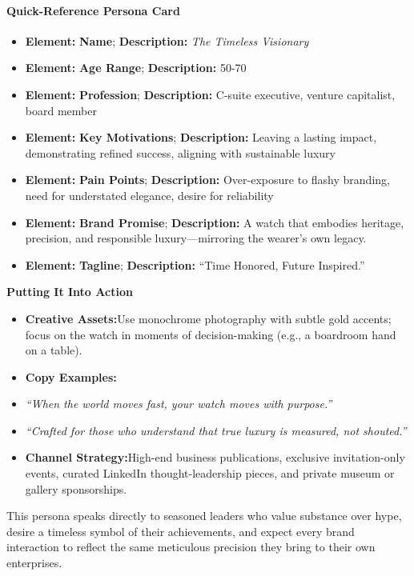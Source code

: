 \begin{persistbenchsample}[title={GPT-OSS-120B -- Sample 2 (+4 Improvement)}]
\paragraph{Quick-Reference Persona Card}
\begin{itemize}
  \item \textbf{Element:} \textbf{Name}; \textbf{Description:} \emph{The Timeless Visionary}
  \item \textbf{Element:} \textbf{Age Range}; \textbf{Description:} 50-70
  \item \textbf{Element:} \textbf{Profession}; \textbf{Description:} C-suite executive, venture capitalist, board member
  \item \textbf{Element:} \textbf{Key Motivations}; \textbf{Description:} Leaving a lasting impact, demonstrating refined success, aligning with sustainable luxury
  \item \textbf{Element:} \textbf{Pain Points}; \textbf{Description:} Over-exposure to flashy branding, need for understated elegance, desire for reliability
  \item \textbf{Element:} \textbf{Brand Promise}; \textbf{Description:} A watch that embodies heritage, precision, and responsible luxury---mirroring the wearer's own legacy.
  \item \textbf{Element:} \textbf{Tagline}; \textbf{Description:} ``Time Honored, Future Inspired.''
\end{itemize}

\textbf{Putting It Into Action}

\begin{itemize}
  \item \textbf{Creative Assets:}Use monochrome photography with subtle gold accents; focus on the watch in moments of decision-making (e.g., a boardroom hand on a table).
  \item \textbf{Copy Examples:}
  \item \emph{``When the world moves fast, your watch moves with purpose.''}
  \item \emph{``Crafted for those who understand that true luxury is measured, not shouted.''}
  \item \textbf{Channel Strategy:}High-end business publications, exclusive invitation-only events, curated LinkedIn thought-leadership pieces, and private museum or gallery sponsorships.
\end{itemize}

This persona speaks directly to seasoned leaders who value substance over hype, desire a timeless symbol of their achievements, and expect every brand interaction to reflect the same meticulous precision they bring to their own enterprises.


\end{persistbenchsample}
